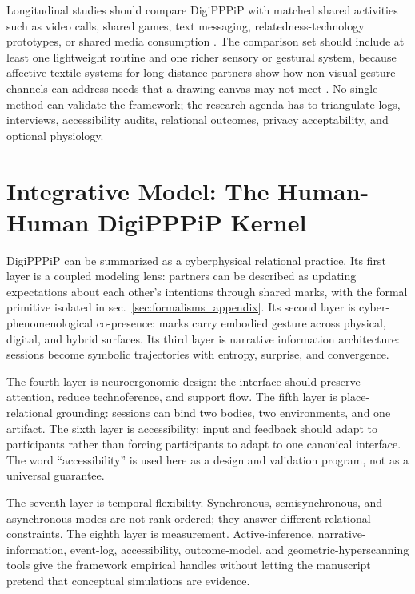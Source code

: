 \documentclass[
  english,
]{article}
\begin{document}
Longitudinal studies should compare DigiPPPiP with matched shared
activities such as video calls, shared games, text messaging,
relatedness-technology prototypes, or shared media consumption
\citep{wenhart2025relatedness}. The comparison set should include at
least one lightweight routine and one richer sensory or gestural system,
because affective textile systems for long-distance partners show how
non-visual gesture channels can address needs that a drawing canvas may
not meet \citep{jiang2025ipillowpal}. No single method can validate the
framework; the research agenda has to triangulate logs, interviews,
accessibility audits, relational outcomes, privacy acceptability, and
optional physiology.

\newpage

\section{Integrative Model: The Human-Human DigiPPPiP
Kernel}\label{sec:integrative}

DigiPPPiP can be summarized as a cyberphysical relational practice. Its
first layer is a coupled modeling lens: partners can be described as
updating expectations about each other's intentions through shared
marks, with the formal primitive isolated in
sec.~\ref{sec:formalisms_appendix}. Its second layer is
cyber-phenomenological co-presence: marks carry embodied gesture across
physical, digital, and hybrid surfaces. Its third layer is narrative
information architecture: sessions become symbolic trajectories with
entropy, surprise, and convergence.

The fourth layer is neuroergonomic design: the interface should preserve
attention, reduce technoference, and support flow. The fifth layer is
place-relational grounding: sessions can bind two bodies, two
environments, and one artifact. The sixth layer is accessibility: input
and feedback should adapt to participants rather than forcing
participants to adapt to one canonical interface. The word
``accessibility'' is used here as a design and validation program, not
as a universal guarantee.

The seventh layer is temporal flexibility. Synchronous, semisynchronous,
and asynchronous modes are not rank-ordered; they answer different
relational constraints. The eighth layer is measurement.
Active-inference, narrative-information, event-log, accessibility,
outcome-model, and geometric-hyperscanning tools give the framework
empirical handles without letting the manuscript pretend that conceptual
simulations are evidence.
\end{document}
